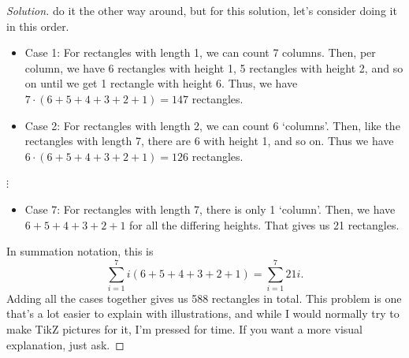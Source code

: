 \documentclass{article}
\newenvironment{solution}
  {\renewcommand\qedsymbol{$\blacksquare$}\begin{proof}[Solution]}
  {\end{proof}}
\begin{document}
\begin{enumerate}
\begin{solution}
        do it the other way around, but for this solution, let's consider doing it in this order.\begin{itemize} 
            \item Case 1: For rectangles with length 1, we can count 7 columns. Then, per column, we have 6 rectangles with height 1, 5 rectangles with height 2, and so on until we get 1 rectangle with height 6. Thus, we have $7\cdot(6+5+4+3+2+1) = 147$ rectangles. 
            \item Case 2: For rectangles with length 2, we can count 6 `columns'. Then, like the rectangles with length 7, there are 6 with height 1, and so on. Thus we have $6 \cdot (6+5+4+3+2+1) = 126$ rectangles. 
        \end{itemize} \begin{center} \vspace{-\parskip} $\vdots$ \end{center} \begin{itemize} 
            \item Case 7: For rectangles with length 7, there is only 1 `column'. Then, we have $6+5+4+3+2+1$ for all the differing heights. That gives us 21 rectangles. 
        \end{itemize} In summation notation, this is\[
            \sum_{i=1}^7 i (6+5+4+3+2+1) = \sum_{i=1}^7 21i.     
        \] Adding all the cases together gives us 588 rectangles in total. This problem is one that's a lot easier to explain with illustrations, and while I would normally 
        try to make TikZ pictures for it, I'm pressed for time. If you want a more visual explanation, just ask. 
    \end{solution} 
\end{enumerate} 
\end{document}
